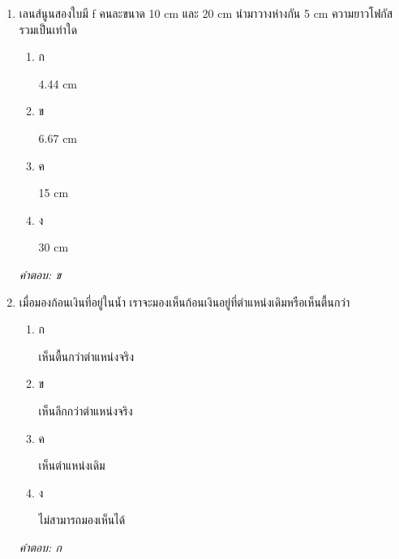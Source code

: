 \documentclass[12pt]{article}
\begin{document}
\begin{enumerate}[label=\arabic*., itemsep=0.5\baselineskip, topsep=0.5\baselineskip, leftmargin=*]
\item เลนส์นูนสองใบมี f คนละขนาด 10 cm และ 20 cm นำมาวางห่างกัน 5 cm ความยาวโฟกัสรวมเป็นเท่าใด
\begin{enumerate}[label=\alph*)., itemsep=0.3\baselineskip, topsep=0.3\baselineskip]
\item ก\ 
\begin{minipage}[t]{0.9\linewidth}
\raggedright 4.44 cm
\end{minipage}
\item ข\ 
\begin{minipage}[t]{0.9\linewidth}
\raggedright 6.67 cm
\end{minipage}
\item ค\ 
\begin{minipage}[t]{0.9\linewidth}
\raggedright 15 cm
\end{minipage}
\item ง\ 
\begin{minipage}[t]{0.9\linewidth}
\raggedright 30 cm
\end{minipage}
\end{enumerate}
\vspace{-0.3\baselineskip}
\begin{small}
\textit{คำตอบ: ข}
\end{small}

\item เมื่อมองก้อนเงินที่อยู่ในน้ำ เราจะมองเห็นก้อนเงินอยู่ที่ตำแหน่งเดิมหรือเห็นตื้นกว่า
\begin{enumerate}[label=\alph*)., itemsep=0.3\baselineskip, topsep=0.3\baselineskip]
\item ก\ 
\begin{minipage}[t]{0.9\linewidth}
\raggedright เห็นตื้นกว่าตำแหน่งจริง
\end{minipage}
\item ข\ 
\begin{minipage}[t]{0.9\linewidth}
\raggedright เห็นลึกกว่าตำแหน่งจริง
\end{minipage}
\item ค\ 
\begin{minipage}[t]{0.9\linewidth}
\raggedright เห็นตำแหน่งเดิม
\end{minipage}
\item ง\ 
\begin{minipage}[t]{0.9\linewidth}
\raggedright ไม่สามารถมองเห็นได้
\end{minipage}
\end{enumerate}
\vspace{-0.3\baselineskip}
\begin{small}
\textit{คำตอบ: ก}
\end{small}


\end{enumerate}
\end{document}
